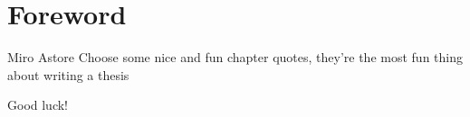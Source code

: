 \chapter*{Foreword}
\label{chap:foreword}
\begin{chapquote} {Miro Astore}
Choose some nice and fun chapter quotes, they're the most fun thing about writing a thesis
\end{chapquote}

Good luck!



